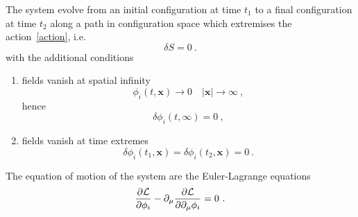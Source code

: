     \begin{princ}
        The system evolve from an initial configuration at time $t_1$ to a final configuration at time $t_2$ along a path in configuration space which extremises the action~\eqref{action}, i.e.
        \begin{equation}\label{statact}
            \delta S = 0 ~.
        \end{equation}
        with the additional conditions 
        \begin{enumerate}
            \item fields vanish at spatial infinity
                \begin{equation*}
                    \phi_i(t, \mathbf x) \rightarrow 0 \quad |\mathbf x| \rightarrow \infty ~,
                \end{equation*}
                hence
                \begin{equation}\label{space}
                    \delta \phi_i (t, \infty) = 0 ~,
                \end{equation}
            \item fields vanish at time extremes
                \begin{equation}\label{time}
                    \delta \phi_i (t_1, \mathbf x) = \delta \phi_i (t_2, \mathbf x) = 0 ~.
                \end{equation}
        \end{enumerate}
    \end{princ}

    The equation of motion of the system are the Euler-Lagrange equations
    \begin{equation}\label{eleq}
        \frac{\partial\mathcal L}{\partial\phi_i} - \partial_\mu \frac{\partial\mathcal L}{\partial\partial_\mu \phi_i} = 0 ~.
    \end{equation}

